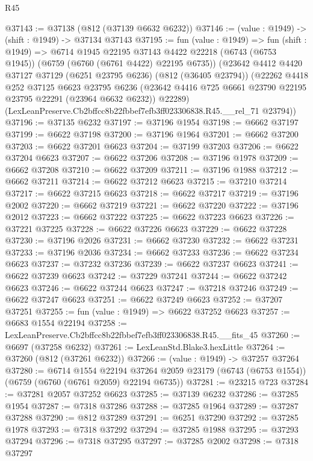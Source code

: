 \begin{lexlean}{R45}
\begin{coremodule}
{@37143 := @37138 (@812 (@37139 @6632 @6232))
@37146 := (value : @1949) -> (shift : @1949) -> @37134 @37143
@37195 := fun (value : @1949) =>
  fun (shift : @1949) =>
  @6714
    @1945
    @22195
    @37143
    @4422
    @22218
    (@6743 (@6753 @1945))
    (@6759 (@6760 (@6761 @4422) @22195 @6735))
    (@23642
      @4412
      @4420
      @37127
      @37129
      (@6251 @23795 @6236)
      (@812 (@36405 @23794))
      (@22262
        @4418
        @252
        @37125
        @6623
        @23795
        @6236
        (@23642 @4416 @725 @6661 @23790 @22195 @23795 @22291 (@23964 @6632 @6232))
        @22289)
      (LexLeanPreserve.Cb2bffcc8b22fbbef7efb3ff023306838.R45.__rel_71 @23794))
@37196 := @37135 @6232
@37197 := @37196 @1954
@37198 := @6662 @37197
@37199 := @6622 @37198
@37200 := @37196 @1964
@37201 := @6662 @37200
@37203 := @6622 @37201 @6623
@37204 := @37199 @37203
@37206 := @6622 @37204 @6623
@37207 := @6622 @37206
@37208 := @37196 @1978
@37209 := @6662 @37208
@37210 := @6622 @37209
@37211 := @37196 @1988
@37212 := @6662 @37211
@37214 := @6622 @37212 @6623
@37215 := @37210 @37214
@37217 := @6622 @37215 @6623
@37218 := @6622 @37217
@37219 := @37196 @2002
@37220 := @6662 @37219
@37221 := @6622 @37220
@37222 := @37196 @2012
@37223 := @6662 @37222
@37225 := @6622 @37223 @6623
@37226 := @37221 @37225
@37228 := @6622 @37226 @6623
@37229 := @6622 @37228
@37230 := @37196 @2026
@37231 := @6662 @37230
@37232 := @6622 @37231
@37233 := @37196 @2036
@37234 := @6662 @37233
@37236 := @6622 @37234 @6623
@37237 := @37232 @37236
@37239 := @6622 @37237 @6623
@37241 := @6622 @37239 @6623
@37242 := @37229 @37241
@37244 := @6622 @37242 @6623
@37246 := @6622 @37244 @6623
@37247 := @37218 @37246
@37249 := @6622 @37247 @6623
@37251 := @6622 @37249 @6623
@37252 := @37207 @37251
@37255 := fun (value : @1949) => @6622 @37252 @6623
@37257 := @6683 @1554 @22194
@37258 := LexLeanPreserve.Cb2bffcc8b22fbbef7efb3ff023306838.R45.__fits_45
@37260 := @6697 (@37258 @6232)
@37261 := LexLeanStd.Blake3.hexLittle
@37264 := @37260 (@812 (@37261 @6232))
@37266 := (value : @1949) -> @37257 @37264
@37280 := @6714
    @1554
    @22194
    @37264
    @2059
    @23179
    (@6743 (@6753 @1554))
    (@6759 (@6760 (@6761 @2059) @22194 @6735))
@37281 := @23215 @723
@37284 := @37281 @2057 @37252 @6623
@37285 := @37139 @6232
@37286 := @37285 @1954
@37287 := @7318 @37286
@37288 := @37285 @1964
@37289 := @37287 @37288
@37290 := @812 @37289
@37291 := @6251 @37290
@37292 := @37285 @1978
@37293 := @7318 @37292
@37294 := @37285 @1988
@37295 := @37293 @37294
@37296 := @7318 @37295
@37297 := @37285 @2002
@37298 := @7318 @37297
}
\end{coremodule}
\end{lexlean}
